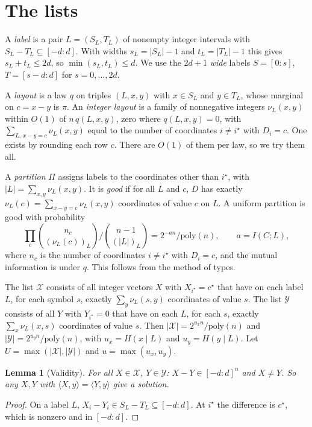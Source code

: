 \documentclass[11pt]{article}
\newtheorem{lemma}[theorem]{Lemma}
\theoremstyle{remark}
\newcommand{\Xs}{\mathcal X}
\newcommand{\Ys}{\mathcal Y}
\newcommand{\ip}[2]{\langle #1,#2\rangle}
\newcommand{\cc}[1]{[-#1:#1]}
\begin{document}
\section{The lists}\label{sec:lists}

A \emph{label} is a pair $L=(S_L,T_L)$ of nonempty integer intervals with $S_L-T_L\subseteq\cc d$. With widths $s_L=|S_L|-1$ and $t_L=|T_L|-1$ this gives $s_L+t_L\le2d$, so $\min(s_L,t_L)\le d$. We use the $2d+1$ \emph{wide} labels $S=[0:s]$, $T=[s-d:d]$ for $s=0,\dots,2d$.

A \emph{layout} is a law $q$ on triples $(L,x,y)$ with $x\in S_L$ and $y\in T_L$, whose marginal on $c=x-y$ is $\pi$. An \emph{integer layout} is a family of nonnegative integers $\nu_L(x,y)$ within $O(1)$ of $n\,q(L,x,y)$, zero where $q(L,x,y)=0$, with $\sum_{L,\,x-y=c}\nu_L(x,y)$ equal to the number of coordinates $i\ne i^\star$ with $D_i=c$. One exists by rounding each row $c$. There are $O(1)$ of them per law, so we try them all.

A \emph{partition} $\Pi$ assigns labels to the coordinates other than $i^\star$, with $|L|=\sum_{x,y}\nu_L(x,y)$. It is \emph{good} if for all $L$ and $c$, $D$ has exactly $\nu_L(c)=\sum_{x-y=c}\nu_L(x,y)$ coordinates of value $c$ on $L$. A uniform partition is good with probability
\[
\prod_c\binom{n_c}{(\nu_L(c))_L}\Big/\binom{n-1}{(|L|)_L}=2^{-an}/\mathrm{poly}(n),\qquad a=I(C;L),
\]
where $n_c$ is the number of coordinates $i\ne i^\star$ with $D_i=c$, and the mutual information is under $q$. This follows from the method of types.

The list $\Xs$ consists of all integer vectors $X$ with $X_{i^\star}=c^\star$ that have on each label $L$, for each symbol $s$, exactly $\sum_y\nu_L(s,y)$ coordinates of value $s$. The list $\Ys$ consists of all $Y$ with $Y_{i^\star}=0$ that have on each $L$, for each $s$, exactly $\sum_x\nu_L(x,s)$ coordinates of value $s$. Then $|\Xs|=2^{u_xn}/\mathrm{poly}(n)$ and $|\Ys|=2^{u_yn}/\mathrm{poly}(n)$, with $u_x=H(x\mid L)$ and $u_y=H(y\mid L)$. Let $U=\max(|\Xs|,|\Ys|)$ and $u=\max(u_x,u_y)$.

\begin{lemma}[Validity]\label{lem:valid}
For all $X\in\Xs$, $Y\in\Ys$: $X-Y\in\cc d^n$ and $X\ne Y$. So any $X,Y$ with $\ip Xy=\ip Yy$ give a solution.
\end{lemma}
\begin{proof}
On a label $L$, $X_i-Y_i\in S_L-T_L\subseteq\cc d$. At $i^\star$ the difference is $c^\star$, which is nonzero and in $\cc d$.
\end{proof}
\end{document}
